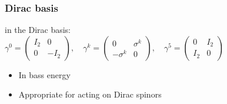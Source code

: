 \label{definition}
\begin{frame}\frametitle{Dirac basis}

in the Dirac basis:\\

$\gamma ^{0}={\begin{pmatrix}I_{2}&0\\0&-I_{2}\end{pmatrix}},\quad \gamma ^{k}={\begin{pmatrix}0&\sigma ^{k}\\-\sigma ^{k}&0\end{pmatrix}},\quad \gamma ^{5}={\begin{pmatrix}0&I_{2}\\I_{2}&0\end{pmatrix}}$
 
\begin{itemize}
 \item In bass energy
  \item  Appropriate for acting on Dirac spinors
\end{itemize}

\end{frame}
